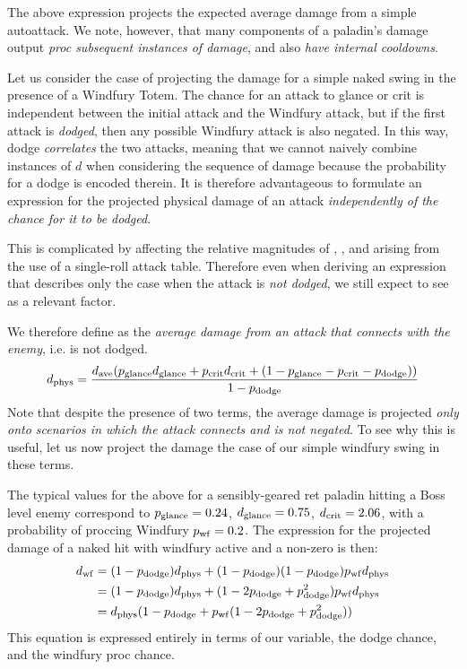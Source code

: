 \documentclass[letterpaper,11pt]{article}
\begin{document}
	The above expression projects the expected average damage from a simple autoattack.
	We note, however, that many components of a paladin's damage output \emph{proc subsequent instances of damage}, and also \emph{have internal cooldowns}.
	
	Let us consider the case of projecting the damage for a simple naked swing in the presence of a Windfury Totem.
	The chance for an attack to glance or crit is independent between the initial attack and the Windfury attack, but if the first attack is \emph{dodged}, then any possible Windfury attack is also negated.
	In this way, dodge \emph{correlates} the two attacks, meaning that we cannot naively combine instances of $d$ when considering the sequence of damage because the probability for a dodge is encoded therein.
	It is therefore advantageous to formulate an expression for the projected physical damage of an attack \emph{independently of the chance for it to be dodged}.
	
	This is complicated by \pdodge affecting the relative magnitudes of \phit, \pglance, and \pcrit arising from the use of a single-roll attack table.
	Therefore even when deriving an expression that describes only the case when the attack is \emph{not dodged}, we still expect to see \pdodge as a relevant factor.
	
	We therefore define \dphys as the \emph{average damage from an attack that connects with the enemy}, i.e. is not dodged.
	\begin{equation}
		d_{\mathrm{phys}}  = \frac{d_{\mathrm{ave}}  (p_{\mathrm{glance}}  d_{\mathrm{glance}}  + p_{\mathrm{crit}}  d_{\mathrm{crit}}  + (1 - p_{\mathrm{glance}}  - p_{\mathrm{crit}}  - p_{\mathrm{dodge}} ))}{1 - p_{\mathrm{dodge}} }
	\end{equation}
	Note that despite the presence of two \pdodge terms, the average damage is projected \emph{only onto scenarios in which the attack connects and is not negated}.
	To see why this is useful, let us now project the damage the case of our simple windfury swing in these terms.

	The typical values for the above for a sensibly-geared ret paladin hitting a Boss level enemy correspond to $p_{\mathrm{glance}}  = 0.24$, $d_{\mathrm{glance}}  = 0.75$, $d_{\mathrm{crit}}  = 2.06$, with a probability of proccing Windfury $p_{\mathrm{wf}}  = 0.2$.
	The expression for the projected damage of a naked hit with windfury active and a non-zero \pdodge is then:
	\begin{equation*}
		\begin{aligned}
			d_\mathrm{wf} &= (1 - p_{\mathrm{dodge}} ) d_{\mathrm{phys}}  + (1 - p_{\mathrm{dodge}} ) (1 - p_{\mathrm{dodge}} ) p_{\mathrm{wf}}  d_{\mathrm{phys}} \\
				    	  &= (1 - p_{\mathrm{dodge}} ) d_{\mathrm{phys}}  + (1 - 2p_{\mathrm{dodge}}  + p_{\mathrm{dodge}} ^2) p_{\mathrm{wf}}  d_{\mathrm{phys}}  \\
				    	  &= d_{\mathrm{phys}} (1 - p_{\mathrm{dodge}}  + p_{\mathrm{wf}} (1 - 2p_{\mathrm{dodge}}  + p_{\mathrm{dodge}} ^2))
		\end{aligned}
	\end{equation*}
	This equation is expressed entirely in terms of our \dphys variable, the dodge chance, and the windfury proc chance.
	
\end{document}
